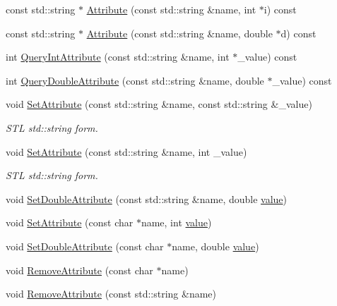 \begin{DoxyCompactItemize}
\item 
const std\-::string $\ast$ \hyperlink{class_ti_xml_element_aac36701ac5de73e9ef8c0b1d128e7782}{Attribute} (const std\-::string \&name, int $\ast$i) const 
\item 
const std\-::string $\ast$ \hyperlink{class_ti_xml_element_a7131fe25a7e512f52ffa27518e108b7e}{Attribute} (const std\-::string \&name, double $\ast$d) const 
\item 
int \hyperlink{class_ti_xml_element_ad79cb2416a5b94784f9a517add7e2d6d}{Query\-Int\-Attribute} (const std\-::string \&name, int $\ast$\-\_\-value) const 
\item 
int \hyperlink{class_ti_xml_element_a157250e0c0303657d911f6991106ba73}{Query\-Double\-Attribute} (const std\-::string \&name, double $\ast$\-\_\-value) const 
\item 
void \hyperlink{class_ti_xml_element_a80ed65b1d194c71c6c9986ae42337d7d}{Set\-Attribute} (const std\-::string \&name, const std\-::string \&\-\_\-value)
\begin{DoxyCompactList}\small\item\em S\-T\-L std\-::string form. \end{DoxyCompactList}\item 
void \hyperlink{class_ti_xml_element_a6f18d54fbe25bbc527936ee65363b3c5}{Set\-Attribute} (const std\-::string \&name, int \-\_\-value)
\begin{DoxyCompactList}\small\item\em S\-T\-L std\-::string form. \end{DoxyCompactList}\item 
void \hyperlink{class_ti_xml_element_ac2112d423b39a93012b241f6baf4d3d3}{Set\-Double\-Attribute} (const std\-::string \&name, double \hyperlink{class_ti_xml_node_aead528b3cedc33c16a6c539872c7cc8b}{value})
\item 
void \hyperlink{class_ti_xml_element_ace6f4be75e373726d4774073d666d1a7}{Set\-Attribute} (const char $\ast$name, int \hyperlink{class_ti_xml_node_aead528b3cedc33c16a6c539872c7cc8b}{value})
\item 
void \hyperlink{class_ti_xml_element_a0d1dd975d75496778177e35abfe0ec0b}{Set\-Double\-Attribute} (const char $\ast$name, double \hyperlink{class_ti_xml_node_aead528b3cedc33c16a6c539872c7cc8b}{value})
\item 
void \hyperlink{class_ti_xml_element_a56979767deca794376b1dfa69a525b2a}{Remove\-Attribute} (const char $\ast$name)
\item 
void \hyperlink{class_ti_xml_element_a1afa6aea716511326a608e4c05df4f3a}{Remove\-Attribute} (const std\-::string \&name)

\end{DoxyCompactItemize}
